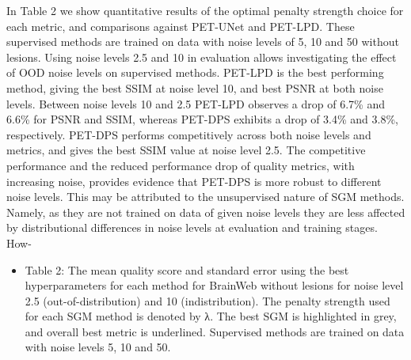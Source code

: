 \documentclass{article}
\begin{document}
In Table 2 we show quantitative results of the optimal penalty strength choice for each metric, and comparisons against PET-UNet and PET-LPD. These supervised methods are trained on data with noise levels of 5, 10 and 50 without lesions. Using noise levels 2.5 and 10 in evaluation allows investigating the effect of OOD noise levels on supervised methods. PET-LPD is the best performing method, giving the best SSIM at noise level 10, and best PSNR at both noise levels. Between noise levels 10 and 2.5 PET-LPD observes a drop of 6.7\% and 6.6\% for PSNR and SSIM, whereas PET-DPS exhibits a drop of 3.4\% and 3.8\%, respectively. PET-DPS performs competitively across both noise levels and metrics, and gives the best SSIM value at noise level 2.5. The competitive performance and the reduced performance drop of quality metrics, with increasing noise, provides evidence that PET-DPS is more robust to different noise levels. This may be attributed to the unsupervised nature of SGM methods. Namely, as they are not trained on data of given noise levels they are less affected by distributional differences in noise levels at evaluation and training stages. How-
\begin{itemize}
\item 
Table 2: The mean quality score and standard error using the best hyperparameters for each method for BrainWeb without lesions for noise level 2.5 (out-of-distribution) and 10 (indistribution). The penalty strength used for each SGM method is denoted by λ. The best SGM is highlighted in grey, and overall best metric is underlined. Supervised methods are trained on data with noise levels 5, 10 and 50.

\end{itemize}
\end{document}
